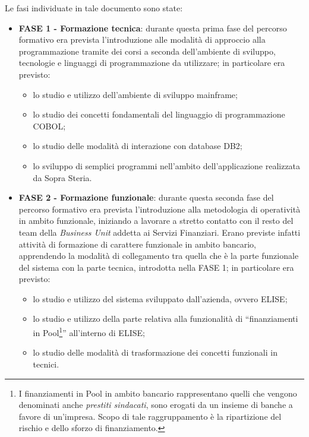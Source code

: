 \newpage

	Le fasi individuate in tale documento sono state:
	
	\begin{itemize}
		\item \textbf{FASE 1 - Formazione tecnica}: durante questa prima fase del percorso formativo era prevista l'introduzione alle modalità di approccio alla programmazione tramite dei corsi a seconda dell'ambiente di sviluppo, tecnologie e linguaggi di programmazione da utilizzare; in particolare era previsto: 
			\begin{itemize}
				\item lo studio e utilizzo dell'ambiente di sviluppo mainframe;
				\item lo studio dei concetti fondamentali del linguaggio di programmazione COBOL\glossario;
				\item lo studio delle modalità di interazione con database DB2;
				\item lo sviluppo di semplici programmi nell'ambito dell'applicazione realizzata da Sopra Steria.
			\end{itemize}
		\item \textbf{FASE 2 - Formazione funzionale}: durante questa seconda fase del percorso formativo era prevista l'introduzione alla metodologia di operatività in ambito funzionale, iniziando a lavorare a stretto contatto con il resto del team della \textit{Business Unit} addetta ai Servizi Finanziari. Erano previste infatti attività di formazione di carattere funzionale in ambito bancario, apprendendo la modalità di collegamento tra quella che è la parte funzionale del sistema con la parte tecnica, introdotta nella FASE 1; in particolare era previsto: 
			\begin{itemize}
				\item lo studio e utilizzo del sistema sviluppato dall'azienda, ovvero ELISE\glossario;
				\item lo studio e utilizzo della parte relativa alla funzionalità di “finanziamenti in Pool\footnote{I finanziamenti in Pool in ambito bancario rappresentano quelli che vengono denominati anche \textit{prestiti sindacati}, sono erogati da un insieme di banche a favore di un'impresa. Scopo di tale raggruppamento è la ripartizione del rischio e dello sforzo di finanziamento.}” all'interno di ELISE;
				\item lo studio delle modalità di trasformazione dei concetti funzionali in tecnici.
			\end{itemize}
		

\end{itemize}
